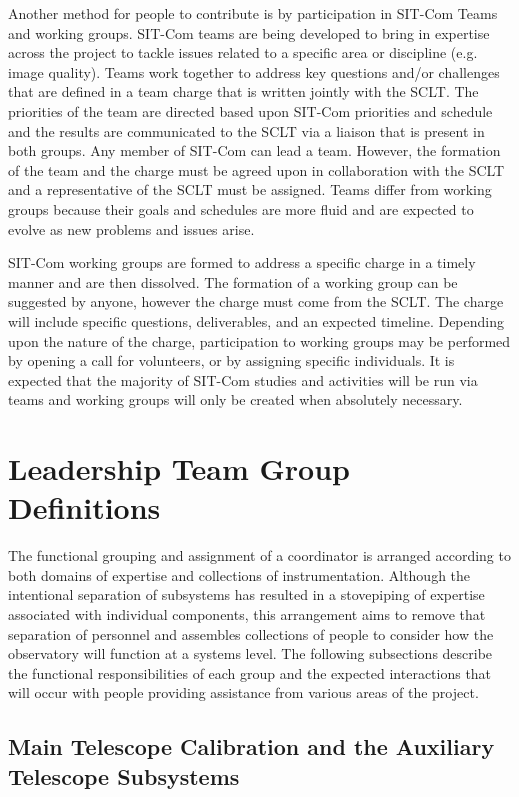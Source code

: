 \documentclass[SE,lsstdraft,authoryear,toc]{lsstdoc}
\begin{document}
Another method for people to contribute is by participation in SIT-Com Teams and working groups.
SIT-Com teams are being developed to bring in expertise across the project to tackle issues related to a specific area or discipline (e.g. image quality).
Teams work together to address key questions and/or challenges that are defined in a team charge that is written jointly with the SCLT.
The priorities of the team are directed based upon SIT-Com priorities and schedule and the results are communicated to the SCLT via a liaison that is present in both groups.
Any member of SIT-Com can lead a team.
However, the formation of the team and the charge must be agreed upon in collaboration with the SCLT and a representative of the SCLT must be assigned.
Teams differ from working groups because their goals and schedules are more fluid and are expected to evolve as new problems and issues arise.

SIT-Com working groups are formed to address a specific charge in a timely manner and are then dissolved.
The formation of a working group can be suggested by anyone, however the charge must come from the SCLT.
The charge will include specific questions, deliverables, and an expected timeline.
Depending upon the nature of the charge, participation to working groups may be performed by opening a call for volunteers, or by assigning specific individuals.
It is expected that the majority of SIT-Com studies and activities will be run via teams and working groups will only be created when absolutely necessary.

\section{Leadership Team Group Definitions}
\label{sec:group_definitions}

The functional grouping and assignment of a coordinator is arranged according to both domains of expertise and collections of instrumentation.
Although the intentional separation of subsystems has resulted in a stovepiping of expertise associated with individual components, this arrangement aims to remove that separation of personnel and assembles collections of people to consider how the observatory will function at a systems level.
The following subsections describe the functional responsibilities of each group and the expected interactions that will occur with people providing assistance from various areas of the project.

\subsection{Main Telescope Calibration and the Auxiliary Telescope Subsystems}
\end{document}
